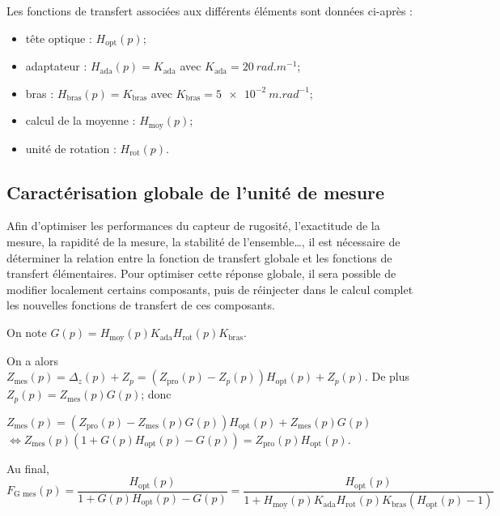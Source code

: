 Les fonctions de transfert associées aux différents éléments sont données ci-après : 
\begin{itemize}
\item tête optique : $H_{\text{opt}}(p)$;
\item adaptateur : $H_{\text{ada}}(p)=K_{\text{ada}}$ avec $K_{\text{ada}}=\SI{20}{rad.m^{-1}}$;
\item bras : $H_{\text{bras}}(p)=K_{\text{bras}}$ avec $K_{\text{bras}}=\SI{5e-2}{m.rad^{-1}}$;
\item calcul de la moyenne : $H_{\text{moy}}(p)$;
\item unité de rotation : $H_{\text{rot}}(p)$.
\end{itemize}

\fi


\subsection{Caractérisation globale de l'unité de mesure}

\ifprof
\else
Afin d’optimiser les performances du capteur de rugosité, l’exactitude de la mesure, la rapidité de la
mesure, la stabilité de l’ensemble…, il est nécessaire de déterminer la relation entre la fonction de transfert
globale et les fonctions de transfert élémentaires. Pour optimiser cette réponse globale, il sera possible de
modifier localement certains composants, puis de réinjecter dans le calcul complet les nouvelles fonctions
de transfert de ces composants.
\fi

\ifprof
\begin{corrige}
On note $G(p)=H_{\text{moy}}(p) K_{\text{ada}} H_{\text{rot}}(p) K_{\text{bras}}$.

On a alors $Z_{\text{mes}}(p)=\Delta_z(p)+Z_p = \left( Z_{\text{pro}}(p) -Z_p(p)\right)  H_{\text{opt}}(p)+Z_p(p)$.
De plus $Z_p (p)= Z_{\text{mes}}(p) G(p)$; donc 

$Z_{\text{mes}}(p)=  \left( Z_{\text{pro}}(p) - Z_{\text{mes}}(p) G(p)\right)  H_{\text{opt}}(p)+ Z_{\text{mes}}(p) G(p)$ 
$\Leftrightarrow Z_{\text{mes}}(p) \left(1+G(p) H_{\text{opt}}(p) - G(p) \right)=   Z_{\text{pro}}(p)  H_{\text{opt}}(p)$. 

Au final,  $F_{\text{G mes}}(p)=\dfrac{H_{\text{opt}}(p)}{1+G(p) H_{\text{opt}}(p) - G(p)} = 
\dfrac{H_{\text{opt}}(p)}{1+H_{\text{moy}}(p) K_{\text{ada}} H_{\text{rot}}(p) K_{\text{bras}}\left( H_{\text{opt}}(p) - 1\right)}$

\end{corrige}
\else
\fi

